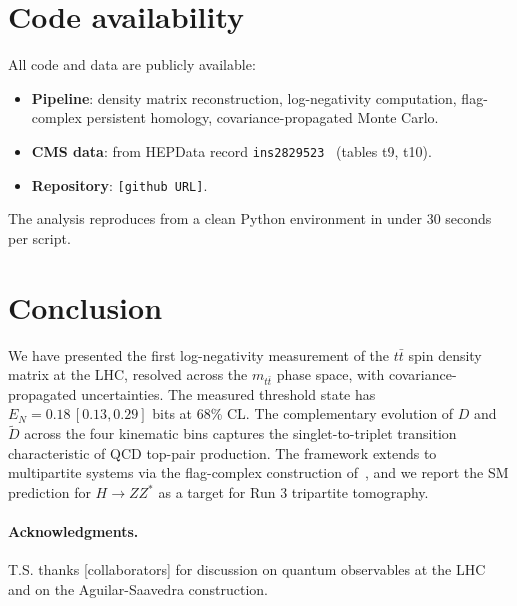 \documentclass[11pt,a4paper]{article}
\theoremstyle{definition}
\begin{document}
\section{Code availability}\label{sec:code}

All code and data are publicly available:

\begin{itemize}
\item \textbf{Pipeline}: density matrix reconstruction, log-negativity computation, flag-complex persistent homology, covariance-propagated Monte Carlo.
\item \textbf{CMS data}: from HEPData record \texttt{ins2829523}~\cite{CMS2024data} (tables t9, t10).
\item \textbf{Repository}: \texttt{[github URL]}.
\end{itemize}

The analysis reproduces from a clean Python environment in under 30 seconds per script.

\section{Conclusion}

We have presented the first log-negativity measurement of the $t\bar{t}$ spin density matrix at the LHC, resolved across the $m_{t\bar{t}}$ phase space, with covariance-propagated uncertainties. The measured threshold state has $E_N = 0.18\,[0.13, 0.29]$ bits at 68\% CL. The complementary evolution of $D$ and $\tilde{D}$ across the four kinematic bins captures the singlet-to-triplet transition characteristic of QCD top-pair production. The framework extends to multipartite systems via the flag-complex construction of~\cite{Scott2026RWF}, and we report the SM prediction for $H \to ZZ^*$ as a target for Run 3 tripartite tomography.

\paragraph{Acknowledgments.} T.S. thanks [collaborators] for discussion on quantum observables at the LHC and on the Aguilar-Saavedra construction.
\end{document}

